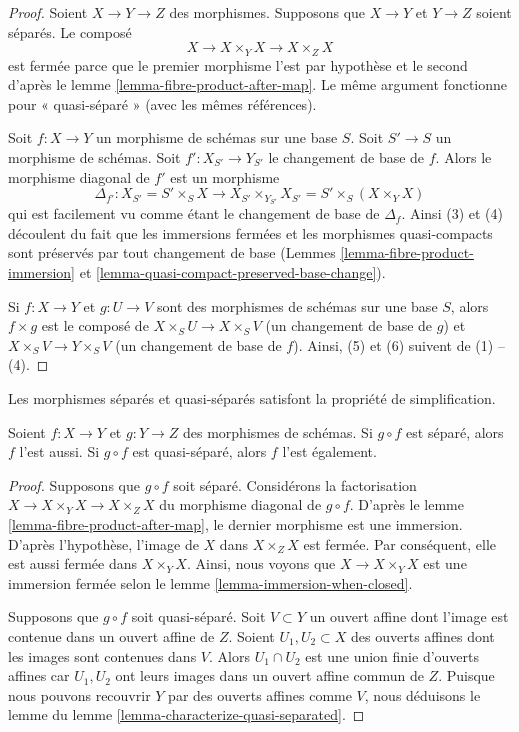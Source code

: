 \begin{proof}
Soient $X \to Y \to Z$ des morphismes. Supposons que $X \to Y$
et $Y \to Z$ soient séparés. Le composé
$$
X \to X \times_Y X \to X \times_Z X
$$
est fermée parce que le premier morphisme l'est par hypothèse et le
second d'après le lemme \ref{lemma-fibre-product-after-map}. Le même argument
fonctionne pour « quasi-séparé » (avec les mêmes références).

\medskip\noindent
Soit $f : X \to Y$ un morphisme de schémas sur une base $S$. Soit
$S' \to S$ un morphisme de schémas. Soit $f' : X_{S'} \to Y_{S'}$ le
changement de base de $f$. Alors le morphisme diagonal de
$f'$ est un morphisme
$$
\Delta_{f'} :
X_{S'} = S' \times_S X
\longrightarrow
X_{S'} \times_{Y_{S'}} X_{S'} = S' \times _S (X \times_Y X)
$$
qui est facilement vu comme étant le changement de base de
$\Delta_f$. Ainsi (3) et (4) découlent du fait que
les immersions fermées et les morphismes quasi-compacts sont
préservés par tout changement de base
(Lemmes \ref{lemma-fibre-product-immersion}
et \ref{lemma-quasi-compact-preserved-base-change}).

\medskip\noindent
Si $f : X \to Y$ et $g : U \to V$ sont des morphismes de schémas sur une base $S$,
alors $f \times g$ est le composé de $X \times_S U \to X \times_S V$ (un
changement de base de $g$) et $X \times_S V \to Y \times_S V$ (un changement de
base de $f$). Ainsi, (5) et (6) suivent de (1) -- (4).
\end{proof}

\begin{lemma}
\label{lemma-compose-after-separated}
\begin{slogan}
Les morphismes séparés et quasi-séparés satisfont la propriété de simplification.
\end{slogan}
Soient $f : X \to Y$ et $g : Y \to Z$ des morphismes de schémas. Si $g
\circ f$ est séparé, alors $f$ l'est aussi. Si
$g \circ f$ est quasi-séparé, alors $f$ l'est également.
\end{lemma}

\begin{proof}
Supposons que $g \circ f$ soit séparé.
Considérons la factorisation $X \to X \times_Y X \to X \times_Z X$ du morphisme
diagonal de $g \circ f$. D'après le lemme
\ref{lemma-fibre-product-after-map}, le dernier
morphisme est une immersion. D'après l'hypothèse, l'image de $X$ dans
$X \times_Z X$ est fermée. Par conséquent, elle est aussi fermée
dans $X \times_Y X$. Ainsi, nous voyons que $X \to X \times_Y X$
est une immersion fermée selon le lemme \ref{lemma-immersion-when-closed}.

\medskip\noindent
Supposons que $g \circ f$ soit quasi-séparé. Soit $V
\subset Y$ un ouvert affine dont l'image est contenue dans un ouvert affine
de $Z$. Soient $U_1, U_2 \subset X$ des ouverts affines dont les images
sont contenues dans $V$. Alors $U_1 \cap U_2$ est une union finie d'ouverts
affines car $U_1, U_2$ ont leurs images dans un ouvert affine commun
de $Z$. Puisque nous pouvons recouvrir $Y$ par des ouverts affines
comme $V$, nous déduisons le lemme du lemme \ref{lemma-characterize-quasi-separated}.
\end{proof}

